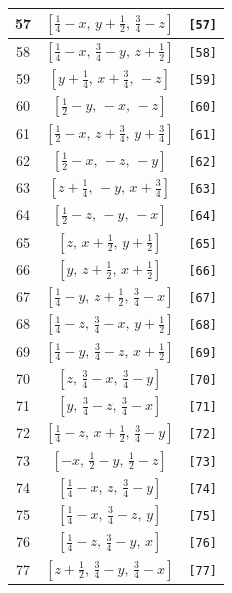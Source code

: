 \documentclass[fleqn,8pt]{jsarticle}
\begin{document}
\begin{longtable}{ccc}
57 & $\left[ \frac{1}{4} - x,\, y + \frac{1}{2},\, \frac{3}{4} - z \right]$ & {\tt [57]} \\ \hline
58 & $\left[ \frac{1}{4} - x,\, \frac{3}{4} - y,\, z + \frac{1}{2} \right]$ & {\tt [58]} \\ \hline
59 & $\left[ y + \frac{1}{4},\, x + \frac{3}{4},\, - z \right]$ & {\tt [59]} \\ \hline
60 & $\left[ \frac{1}{2} - y,\, - x,\, - z \right]$ & {\tt [60]} \\ \hline
61 & $\left[ \frac{1}{2} - x,\, z + \frac{3}{4},\, y + \frac{3}{4} \right]$ & {\tt [61]} \\ \hline
62 & $\left[ \frac{1}{2} - x,\, - z,\, - y \right]$ & {\tt [62]} \\ \hline
63 & $\left[ z + \frac{1}{4},\, - y,\, x + \frac{3}{4} \right]$ & {\tt [63]} \\ \hline
64 & $\left[ \frac{1}{2} - z,\, - y,\, - x \right]$ & {\tt [64]} \\ \hline
65 & $\left[ z,\, x + \frac{1}{2},\, y + \frac{1}{2} \right]$ & {\tt [65]} \\ \hline
66 & $\left[ y,\, z + \frac{1}{2},\, x + \frac{1}{2} \right]$ & {\tt [66]} \\ \hline
67 & $\left[ \frac{1}{4} - y,\, z + \frac{1}{2},\, \frac{3}{4} - x \right]$ & {\tt [67]} \\ \hline
68 & $\left[ \frac{1}{4} - z,\, \frac{3}{4} - x,\, y + \frac{1}{2} \right]$ & {\tt [68]} \\ \hline
69 & $\left[ \frac{1}{4} - y,\, \frac{3}{4} - z,\, x + \frac{1}{2} \right]$ & {\tt [69]} \\ \hline
70 & $\left[ z,\, \frac{3}{4} - x,\, \frac{3}{4} - y \right]$ & {\tt [70]} \\ \hline
71 & $\left[ y,\, \frac{3}{4} - z,\, \frac{3}{4} - x \right]$ & {\tt [71]} \\ \hline
72 & $\left[ \frac{1}{4} - z,\, x + \frac{1}{2},\, \frac{3}{4} - y \right]$ & {\tt [72]} \\ \hline
73 & $\left[ - x,\, \frac{1}{2} - y,\, \frac{1}{2} - z \right]$ & {\tt [73]} \\ \hline
74 & $\left[ \frac{1}{4} - x,\, z,\, \frac{3}{4} - y \right]$ & {\tt [74]} \\ \hline
75 & $\left[ \frac{1}{4} - x,\, \frac{3}{4} - z,\, y \right]$ & {\tt [75]} \\ \hline
76 & $\left[ \frac{1}{4} - z,\, \frac{3}{4} - y,\, x \right]$ & {\tt [76]} \\ \hline
77 & $\left[ z + \frac{1}{2},\, \frac{3}{4} - y,\, \frac{3}{4} - x \right]$ & {\tt [77]} \\ \hline

\end{longtable}
\end{document}
